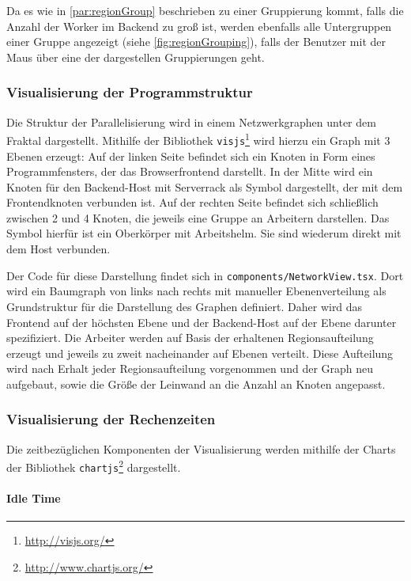 Da es wie in \autoref{par:regionGroup} beschrieben zu einer Gruppierung kommt, falls die Anzahl der Worker im Backend zu
groß ist, werden ebenfalls alle Untergruppen einer Gruppe angezeigt (siehe \autoref{fig:regionGrouping}), falls der Benutzer mit der Maus über eine der 
dargestellen Gruppierungen geht.

\subsubsection{Visualisierung der Programmstruktur}

Die Struktur der Parallelisierung wird in einem Netzwerkgraphen unter dem Fraktal dargestellt.
Mithilfe der Bibliothek \verb|visjs|\footnote{\url{http://visjs.org/}} wird hierzu ein
Graph mit 3 Ebenen erzeugt: Auf der linken Seite befindet sich ein Knoten in Form eines Programmfensters, der das Browserfrontend darstellt.
In der Mitte wird ein Knoten für den Backend-Host mit Serverrack als Symbol dargestellt, der mit dem Frontendknoten verbunden ist.
Auf der rechten Seite befindet sich schließlich zwischen 2 und 4 Knoten, die jeweils eine Gruppe an Arbeitern
darstellen. Das Symbol hierfür ist ein Oberkörper mit Arbeitshelm.
Sie sind wiederum direkt mit dem Host verbunden.

Der Code für diese Darstellung findet sich in \verb|components/NetworkView.tsx|.
Dort wird ein Baumgraph von links nach rechts mit manueller Ebenenverteilung als Grundstruktur für die Darstellung des Graphen definiert.
Daher wird das Frontend auf der höchsten Ebene und der Backend-Host auf der Ebene darunter spezifiziert.
Die Arbeiter werden auf Basis der erhaltenen Regionsaufteilung erzeugt und jeweils zu zweit nacheinander
auf Ebenen verteilt.
Diese Aufteilung wird nach Erhalt jeder Regionsaufteilung vorgenommen und der Graph neu aufgebaut,
sowie die Größe der Leinwand an die Anzahl an Knoten angepasst.

\subsubsection{Visualisierung der Rechenzeiten} %

Die zeitbezüglichen Komponenten der Visualisierung werden mithilfe der Charts
der Bibliothek \verb|chartjs|\footnote{\url{http://www.chartjs.org/}} dargestellt.

\paragraph{Idle Time}

